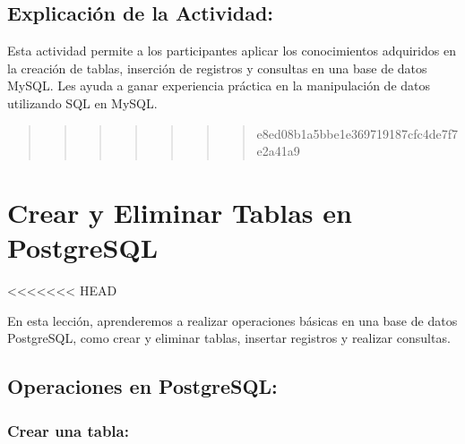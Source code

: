 \documentclass[
  a4paper,
  onepage,
  openany]{scrreprt}
\begin{document}
\hypertarget{explicaciuxf3n-de-la-actividad-73}{%
\section{Explicación de la
Actividad:}\label{explicaciuxf3n-de-la-actividad-73}}

Esta actividad permite a los participantes aplicar los conocimientos
adquiridos en la creación de tablas, inserción de registros y consultas
en una base de datos MySQL. Les ayuda a ganar experiencia práctica en la
manipulación de datos utilizando SQL en MySQL.

\begin{quote}
\begin{quote}
\begin{quote}
\begin{quote}
\begin{quote}
\begin{quote}
\begin{quote}
e8ed08b1a5bbe1e369719187cfc4de7f7e2a41a9
\end{quote}
\end{quote}
\end{quote}
\end{quote}
\end{quote}
\end{quote}
\end{quote}

\hypertarget{crear-y-eliminar-tablas-en-postgresql}{%
\chapter{Crear y Eliminar Tablas en
PostgreSQL}\label{crear-y-eliminar-tablas-en-postgresql}}

\textless\textless\textless\textless\textless\textless\textless{} HEAD

En esta lección, aprenderemos a realizar operaciones básicas en una base
de datos PostgreSQL, como crear y eliminar tablas, insertar registros y
realizar consultas.

\hypertarget{operaciones-en-postgresql}{%
\section{Operaciones en PostgreSQL:}\label{operaciones-en-postgresql}}

\hypertarget{crear-una-tabla-4}{%
\subsection{Crear una tabla:}\label{crear-una-tabla-4}}
\end{document}
